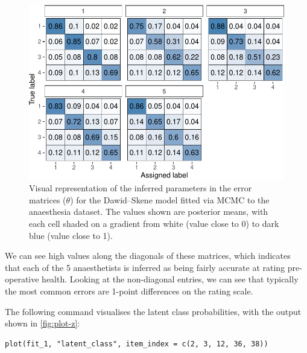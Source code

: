 \begin{figure}

{\centering \includegraphics{rater_files/figure-latex/plot-theta-1} 

}

\caption{Visual representation of the inferred parameters in the error matrices ($\theta$) for the Dawid--Skene model fitted via MCMC to the anaesthesia dataset. The values shown are posterior means, with each cell shaded on a gradient from white (value close to 0) to dark blue (value close to 1).}\label{fig:plot-theta}
\end{figure}

We can see high values along the diagonals of these matrices, which indicates
that each of the 5 anaesthetists is inferred as being fairly accurate at rating
pre-operative health. Looking at the non-diagonal entries, we can see that
typically the most common errors are 1-point differences on the rating scale.

The following command visualises the latent class probabilities, with the
output shown in \autoref{fig:plot-z}:

\begin{verbatim}
plot(fit_1, "latent_class", item_index = c(2, 3, 12, 36, 38))
\end{verbatim}

